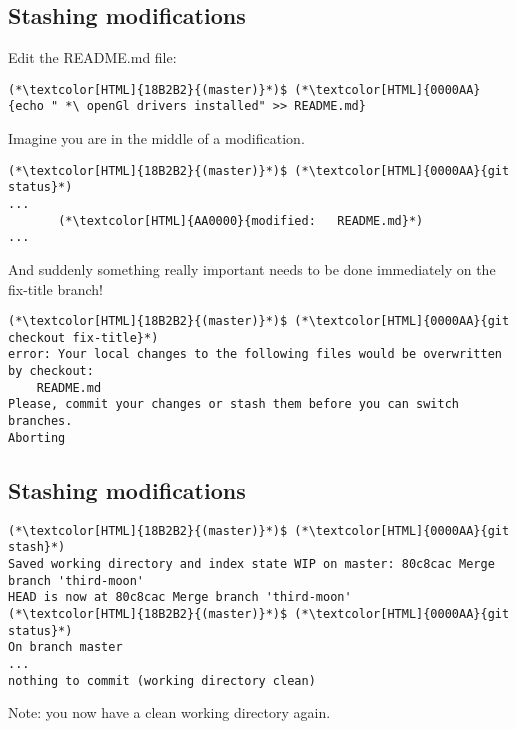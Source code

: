 \subsection{Stashing modifications}
\begin{frame}[fragile]
  \subslidetitle

  Edit the README.md file:
  \begin{lstlisting}
(*\textcolor[HTML]{18B2B2}{(master)}*)$ (*\textcolor[HTML]{0000AA}{echo " *\ openGl drivers installed" >> README.md}
\end{lstlisting}

  Imagine you are in the middle of a modification.

  \begin{lstlisting}
(*\textcolor[HTML]{18B2B2}{(master)}*)$ (*\textcolor[HTML]{0000AA}{git status}*)
...
       (*\textcolor[HTML]{AA0000}{modified:   README.md}*)
...
\end{lstlisting}

  And suddenly something really important needs to be done immediately on the fix-title branch!

  \begin{lstlisting}
(*\textcolor[HTML]{18B2B2}{(master)}*)$ (*\textcolor[HTML]{0000AA}{git checkout fix-title}*)
error: Your local changes to the following files would be overwritten by checkout:
	README.md
Please, commit your changes or stash them before you can switch branches.
Aborting
\end{lstlisting}
\end{frame}

\subsection{Stashing modifications}
\begin{frame}[fragile]
  \subslidetitle

  \begin{lstlisting}
(*\textcolor[HTML]{18B2B2}{(master)}*)$ (*\textcolor[HTML]{0000AA}{git stash}*)
Saved working directory and index state WIP on master: 80c8cac Merge branch 'third-moon'
HEAD is now at 80c8cac Merge branch 'third-moon'
(*\textcolor[HTML]{18B2B2}{(master)}*)$ (*\textcolor[HTML]{0000AA}{git status}*)
On branch master
...
nothing to commit (working directory clean)
\end{lstlisting}
  Note: you now have a clean working directory again.
\end{frame}

